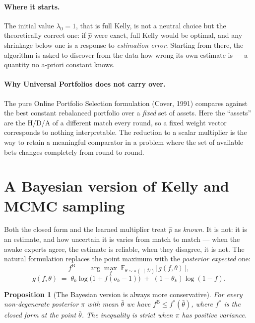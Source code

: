 \documentclass[12pt,a4paper,oneside]{report}
\renewcommand{\_}{\oldunderscore\allowbreak}
\theoremstyle{definition}
\theoremstyle{plain}
\newtheorem{proposition}[theorem]{Proposition}
\theoremstyle{remark}
\begin{document}
\paragraph{Where it starts.} The initial value $\lambda_0 = 1$, that is full Kelly, is not a
neutral choice but the theoretically correct one: if $\hat{p}$ were exact, full Kelly would be
optimal, and any shrinkage below one is a response to \emph{estimation error}. Starting from
there, the algorithm is asked to discover from the data how wrong its own estimate is --- a
quantity no a-priori constant knows.

\paragraph{Why Universal Portfolios does not carry over.} The pure Online Portfolio Selection
formulation (Cover, 1991) compares against the best constant rebalanced portfolio over a
\emph{fixed} set of assets. Here the ``assets'' are the H/D/A of a different match every round,
so a fixed weight vector corresponds to nothing interpretable. The reduction to a scalar
multiplier is the way to retain a meaningful comparator in a problem where the set of available
bets changes completely from round to round.

\section{A Bayesian version of Kelly and MCMC sampling}
\label{sec:mcmc-theory}

Both the closed form and the learned multiplier treat $\hat{p}$ as \emph{known}. It is not: it is
an estimate, and how uncertain it is varies from match to match --- when the awake experts agree,
the estimate is reliable, when they disagree, it is not. The natural formulation replaces the
point maximum with the \emph{posterior expected} one:
\[
f^{\mathrm{B}} \;=\; \arg\max_{f} \; \mathbb{E}_{\theta \sim \pi(\cdot\mid\mathcal{D})}
\big[\, g(f,\theta) \,\big],
\]
\[
g(f,\theta) \;=\; \theta_k \log\big(1+f(o_k-1)\big) \;+\; (1-\theta_k)\log(1-f).
\]

\begin{proposition}[The Bayesian version is always more conservative]
\label{prop:bayes-conservative}
For every non-degenerate posterior $\pi$ with mean $\bar{\theta}$ we have
$f^{\mathrm{B}} \leq f^{*}(\bar{\theta})$, where $f^{*}$ is the closed form at the point
$\bar{\theta}$. The inequality is strict when $\pi$ has positive variance.
\end{proposition}
\end{document}
